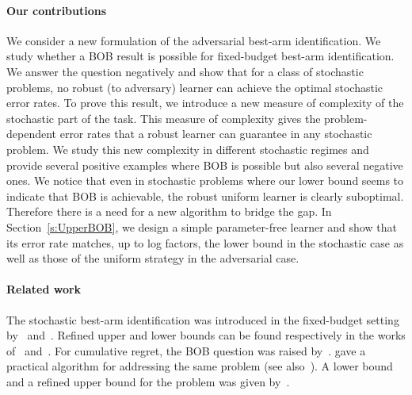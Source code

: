 \paragraph{Our contributions}
We consider a new 
formulation of the adversarial 
best-arm identification. 
We study whether 
a BOB result is possible for fixed-budget best-arm
identification. We answer the question negatively and show that for a class of stochastic problems,
no robust (to adversary) learner can achieve the optimal stochastic error rates.
To prove this result, we introduce a new measure of complexity of the 
stochastic part of the task. This measure of complexity gives the 
problem-dependent error rates that a robust learner
can guarantee in any stochastic problem. 
We study
this new complexity in different stochastic regimes and provide several 
positive examples where BOB is possible but also several negative ones. 
We notice that even in stochastic problems where our lower bound seems 
to indicate that BOB is achievable, the robust uniform learner is clearly suboptimal.
Therefore there is a need for a
new algorithm to bridge the gap.  In Section~\ref{s:UpperBOB}, we
design a simple parameter-free learner and show that its error rate matches, up to log
factors, the lower bound in the stochastic case
as well as those of the uniform strategy in the adversarial case.  
%
%
\paragraph{Related work} The stochastic best-arm identification was introduced in 
the fixed-budget setting by~\cite{Bubeck09PE} and~\cite{Audibert10BA}.
Refined upper and lower bounds 
can be found respectively in the works of~\cite{Karnin13AO} and~\cite{Carpentier16TB}. 
For cumulative regret, the BOB
question was raised by~\cite{Bubeck12BB}. \cite{Seldin14OP} 
gave a practical algorithm for addressing the same problem 
(see also~\citealp{Seldin17IP}). A lower bound and a refined upper bound for the 
problem was given by~\cite{Auer16AA}.

